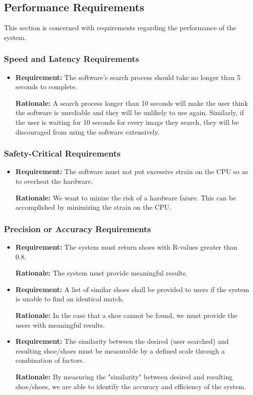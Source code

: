 \documentclass[12pt, titlepage]{article}
\begin{document}
\subsection{Performance Requirements}
This section is concerned with requirements regarding the performance of the system.
\subsubsection{Speed and Latency Requirements}
\begin{itemize}
    \item \textbf{Requirement:} The software's search process should take no longer than 5 seconds to complete.
    
    \textbf{Rationale:} A search process longer than 10 seconds will make the user think the software is unreliable and they will be unlikely to use again. Similarly, if the user is waiting for 10 seconds for every image they search, they will be discouraged from using the software extensively.
\end{itemize}

\subsubsection{Safety-Critical Requirements}
\begin{itemize}
    \item \textbf{Requirement:} The software must not put excessive strain on the CPU so as to overheat the hardware.
    
    \textbf{Rationale:} We want to minize the risk of a hardware faiure. This can be accomplished by minimizing the strain on the CPU.
\end{itemize}

\subsubsection{Precision or Accuracy Requirements}
\begin{itemize} 
    \item 
    \textbf{Requirement:} The system must return shoes with R-values greater than 0.8.
    
    \textbf{Rationale:} The system must provide meaningful results.
    
    \item 
    \textbf{Requirement:} A list of similar shoes shall be provided to users if the system is unable to find an identical match.
    
    \textbf{Rationale:} In the case that a shoe cannot be found, we must provide the users with meaningful results.
    
    
    \item 
    \textbf{Requirement:} The similarity between the desired (user searched) and resulting shoe/shoes must be measurable by a defined scale through a combination of factors.
    
    \textbf{Rationale:} By measuring the "similarity" between desired and resulting shoe/shoes, we are able to identify the accuracy and efficiency of the system.
    
    
\end{itemize}
\end{document}
